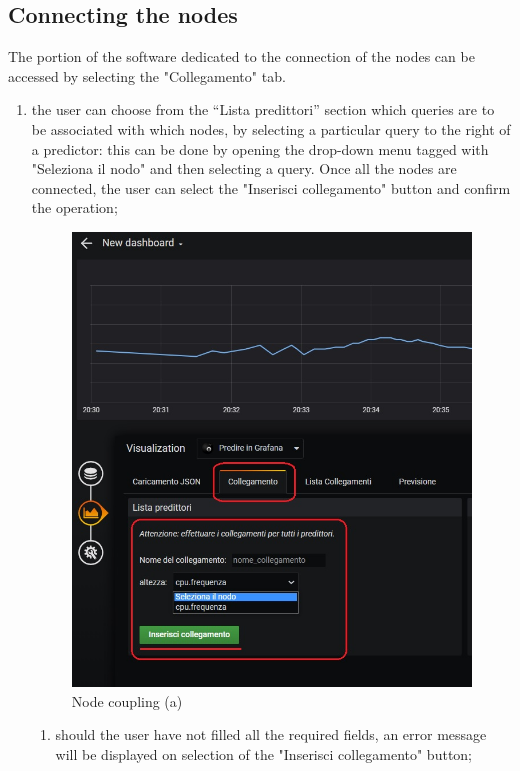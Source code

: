 \subsection{Connecting the nodes}
The portion of the software dedicated to the connection of the nodes can be accessed by selecting the "Collegamento" tab.
\begin{enumerate}
	\item the user can choose from the “Lista predittori” section which queries are to be associated with which nodes, by selecting a particular query to the right of a predictor: this can be done by opening the drop-down menu tagged with "Seleziona il nodo" and then selecting a query.
	Once all the nodes are connected, the user can select the "Inserisci collegamento" button and confirm the operation;
	
\begin{figure}[H]
\centering
\includegraphics[scale=0.75]{img/plug-in/insert_node.jpg}
\caption{Node coupling (a)}
\end{figure}



\begin{enumerate}
\item should the user have not filled all the required fields, an error message will be displayed on selection of the "Inserisci collegamento" button;


\end{enumerate}
\end{enumerate}
